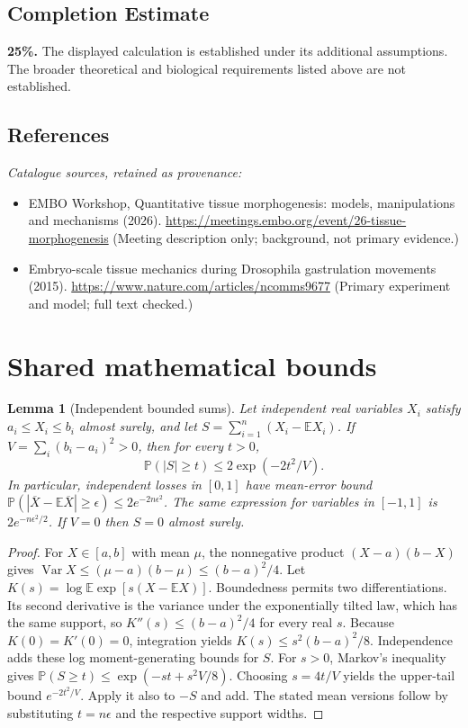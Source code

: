 \documentclass[11pt]{article}
\newcommand{\E}{\mathbb E}
\newcommand{\Prob}{\mathbb P}
\DeclareMathOperator{\Var}{Var}
\providecommand{\E}{\mathbb E}
\providecommand{\Prob}{\mathbb P}
\providecommand{\Var}{\operatorname{Var}}
\newtheorem{sharedlemma}{Lemma}[section]
\begin{document}
\subsection{Completion Estimate}
\textbf{25\%.} The displayed calculation is established under its additional assumptions. The broader theoretical and biological requirements listed above are not established.
\subsection{References}
\noindent\emph{Catalogue sources, retained as provenance:}
\begin{itemize}
\item EMBO Workshop, Quantitative tissue morphogenesis: models, manipulations and mechanisms (2026). \url{https://meetings.embo.org/event/26-tissue-morphogenesis} (Meeting description only; background, not primary evidence.)
\item Embryo-scale tissue mechanics during Drosophila gastrulation movements (2015). \url{https://www.nature.com/articles/ncomms9677} (Primary experiment and model; full text checked.)
\end{itemize}
\clearpage


\appendix
\section{Shared mathematical bounds}\label{app:bounds}
\begin{sharedlemma}[Independent bounded sums]\label{lem:bounded}
Let independent real variables $X_i$ satisfy $a_i\leq X_i\leq b_i$ almost surely,
and let $S=\sum_{i=1}^n(X_i-\E X_i)$. If
$V=\sum_i(b_i-a_i)^2>0$, then for every $t>0$,
\[
 \Prob(|S|\geq t)\leq 2\exp(-2t^2/V).
\]
In particular, independent losses in $[0,1]$ have mean-error bound
$\Prob(|\overline X-\E\overline X|\geq\epsilon)
\leq2e^{-2n\epsilon^2}$. The same expression for variables in $[-1,1]$
is $2e^{-n\epsilon^2/2}$. If $V=0$ then $S=0$ almost surely.
\end{sharedlemma}
\begin{proof}
For $X\in[a,b]$ with mean $\mu$, the nonnegative product
$(X-a)(b-X)$ gives
$\Var X\leq(\mu-a)(b-\mu)\leq(b-a)^2/4$.
Let $K(s)=\log\E\exp[s(X-\E X)]$.
Boundedness permits two differentiations. Its second derivative is the variance
under the exponentially tilted law, which has the same support, so
$K''(s)\leq(b-a)^2/4$ for every real $s$.
Because $K(0)=K'(0)=0$, integration yields
$K(s)\leq s^2(b-a)^2/8$.
Independence adds these log moment-generating bounds for $S$.
For $s>0$, Markov's inequality gives
$\Prob(S\geq t)\leq\exp(-st+s^2V/8)$.
Choosing $s=4t/V$ yields the upper-tail bound $e^{-2t^2/V}$.
Apply it also to $-S$ and add. The stated mean versions follow by substituting
$t=n\epsilon$ and the respective support widths.
\end{proof}
\end{document}
